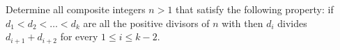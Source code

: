 Determine all composite integers $n>1$ that satisfy the following property:
if $d_1 < d_2 < \dots < d_k$ are all the positive divisors of $n$ with
then $d_i$ divides $d_{i+1} + d_{i+2}$ for every $1 \leq i \leq k - 2$.